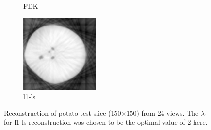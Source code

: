 \documentclass{article}
\begin{document}
\begin{figure}[!h]
\begin{subfigure}[b]{0.3\linewidth}
        \caption{FDK}
    \end{subfigure}
    \begin{subfigure}[b]{0.3\linewidth}
        \includegraphics[width=\textwidth]{../images/potato/2D/cs_blurred_results/24_views/result_CS_lambda0_2.00.png}
        \caption{l1-ls}
    \end{subfigure}
     \caption{Reconstruction of potato test slice (150$\times$150) from 24 views. The $\lambda_1$ for l1-ls reconstruction was chosen to be the optimal value of 2 here.} 
\label{fig:cs_blurred_24_views}
\end{figure}
\end{document}
